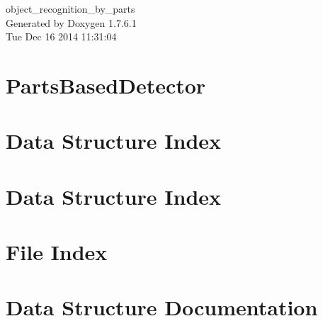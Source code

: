 \documentclass[a4paper]{book}
\begin{document}
\hypersetup{pageanchor=false,citecolor=blue}
\begin{titlepage}
\vspace*{7cm}
\begin{center}
{\Large object\-\_\-recognition\-\_\-by\-\_\-parts }\\
\vspace*{1cm}
{\large \-Generated by Doxygen 1.7.6.1}\\
\vspace*{0.5cm}
{\small Tue Dec 16 2014 11:31:04}\\
\end{center}
\end{titlepage}
\clearemptydoublepage
{}
\tableofcontents
\clearemptydoublepage
{}
\hypersetup{pageanchor=true,citecolor=blue}
\chapter{\-Parts\-Based\-Detector}
\label{index}\hypertarget{index}{}
\chapter{\-Data \-Structure \-Index}

\chapter{\-Data \-Structure \-Index}

\chapter{\-File \-Index}

\chapter{\-Data \-Structure \-Documentation}

























\end{document}
